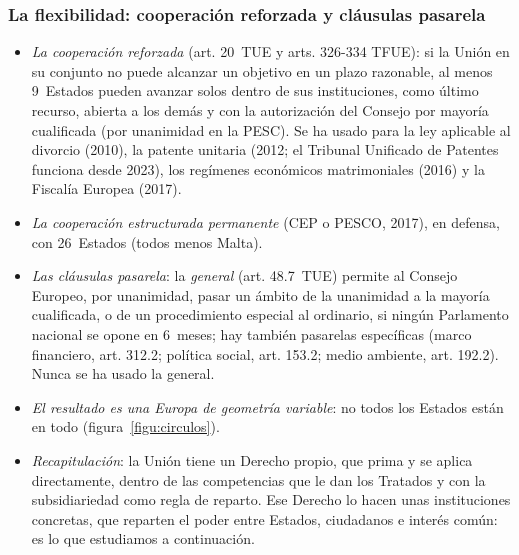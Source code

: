 \documentclass[11pt]{article}
\begin{document}
\subsubsection{La flexibilidad: cooperación reforzada y cláusulas pasarela}\label{sec:flexibilidad}

\begin{itemize}
\item \emph{La cooperación reforzada} (art. 20~TUE y arts. 326-334 TFUE): si la Unión en su conjunto no puede alcanzar un objetivo en un plazo razonable, al menos 9~Estados pueden avanzar solos dentro de sus instituciones, como último recurso, abierta a los demás y con la autorización del Consejo por mayoría cualificada (por unanimidad en la PESC). Se ha usado para la ley aplicable al divorcio (2010), la patente unitaria (2012; el Tribunal Unificado de Patentes funciona desde 2023), los regímenes económicos matrimoniales (2016) y la Fiscalía Europea (2017).
\item \emph{La cooperación estructurada permanente} (CEP o PESCO, 2017), en defensa, con 26~Estados (todos menos Malta).
\item \emph{Las cláusulas pasarela}: la \emph{general} (art. 48.7~TUE) permite al Consejo Europeo, por unanimidad, pasar un ámbito de la unanimidad a la mayoría cualificada, o de un procedimiento especial al ordinario, si ningún Parlamento nacional se opone en 6~meses; hay también pasarelas específicas (marco financiero, art. 312.2; política social, art. 153.2; medio ambiente, art. 192.2). Nunca se ha usado la general.
\item \emph{El resultado es una Europa de geometría variable}: no todos los Estados están en todo (figura~\ref{figu:circulos}).
\end{itemize}

\begin{infografia}[H]
\centering
\caption{La Europa de geometría variable en 2026}\label{figu:circulos}
\end{infografia}

\begin{itemize}
\item \emph{Recapitulación}: la Unión tiene un Derecho propio, que prima y se aplica directamente, dentro de las competencias que le dan los Tratados y con la subsidiariedad como regla de reparto. Ese Derecho lo hacen unas instituciones concretas, que reparten el poder entre Estados, ciudadanos e interés común: es lo que estudiamos a continuación.
\end{itemize}
\end{document}
